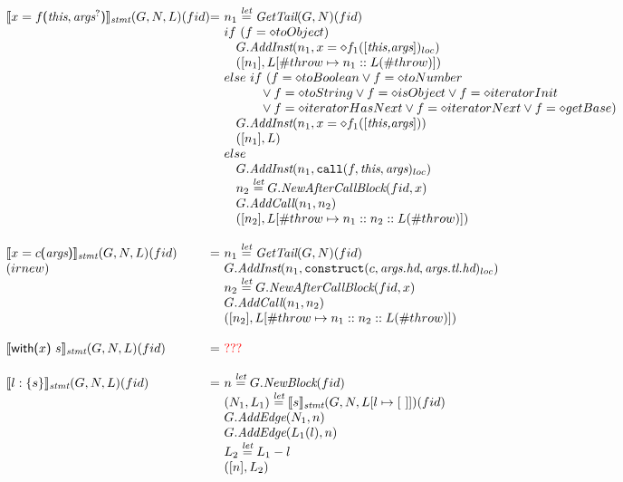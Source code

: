 \[
\begin{array}{l@{}l@{~}l}
\transfun{\ircfgcall{x}{f}{\emph{this}, \emph{args}^{?}}}_{\emph{stmt}}(G,N,L)(fid) & = &
	n_1 \letval \GetTail(G,N)(fid)\\
	& & if\ (f = \diamond{toObject}) \\
	& & \phantom{if} G.\emph{AddInst}(n_1,x =\diamond f_1([\emph{this,args}])_{loc})\\
	& & \phantom{if} ([n_1],L[\#throw \mapsto n_{1}::L(\#throw)])\\
	& & else\ if\ (f = \diamond{toBoolean} \vee f = \diamond{toNumber}\\
	& & \phantom{ififif} \vee f = \diamond{toString} \vee f = \diamond{isObject}\vee f = \diamond{iteratorInit}\\
	& & \phantom{ififif} \vee f = \diamond{iteratorHasNext}\vee f = \diamond{iteratorNext}\vee f = \diamond{getBase})\\
	& & \phantom{if} G.\emph{AddInst}(n_1,x =\diamond f_1([\emph{this,args}]))\\
	& & \phantom{if} ([n_1],L)\\
	& & else\\
	& & \phantom{if} G.\emph{AddInst}(n_1,\TT{call}(f,\emph{this},\emph{args})_{loc})\\
	& & \phantom{if} n_2 \letval G.\emph{NewAfterCallBlock}(fid,x)\\
	& & \phantom{if} G.\emph{AddCall}(n_1, n_2) \\
	& & \phantom{if} ([n_2],L[\# throw \mapsto n_1::n_2::L(\# throw)])\\
	& & \\
	
\transfun{\ircfgnew{x}{c}{\emph{args}}}_{\emph{stmt}}(G,N,L)(fid) & = &
	n_1 \letval \GetTail(G,N)(fid)\\
(irnew)
	& & G.\emph{AddInst}(n_1,\TT{construct}(c,\emph{args.hd},\emph{args.tl.hd})_{loc})\\
	& & n_2 \letval G.\emph{NewAfterCallBlock}(fid,x)\\
	& & G.\emph{AddCall}(n_1, n_2) \\
	& & ([n_2],L[\# throw \mapsto n_1::n_2::L(\# throw)])\\
	& & \\
	
\transfun{\ircfgwith{x}{s}}_{\emph{stmt}}(G,N,L)(fid) & = &
	{\inred ???} \\
	& & \\

\transfun{\irlabel{l}{s}}_{\emph{stmt}}(G,N,L)(fid) & = &
	n \letval G.\emph{NewBlock}(fid)\\\
	& & (N_1,L_1) \letval \transfun{s}_{\emph{stmt}}(G,N,L[l\mapsto[\ ]])(fid)\\
	& & G.\emph{AddEdge}(N_1,n)\\
	& & G.\emph{AddEdge}(L_1(l),n)\\
	& & L_2 \letval L_1 - l\\
	& & ([n],L_2 ) \\
	& & \\


\end{array}\]
